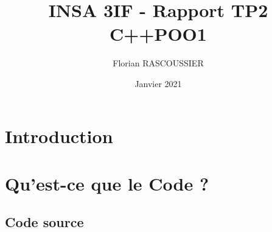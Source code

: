 \documentclass{article}
\title{INSA 3IF - Rapport TP2 C++POO1}
\author{Florian RASCOUSSIER}
\date{Janvier 2021}
\begin{document}
\maketitle

\vspace{10em}

\tableofcontents

\newpage

\section{Introduction}

\section{Qu'est-ce que le Code ?}

\subsection{Code source}








\restoregeometry
\end{document}
